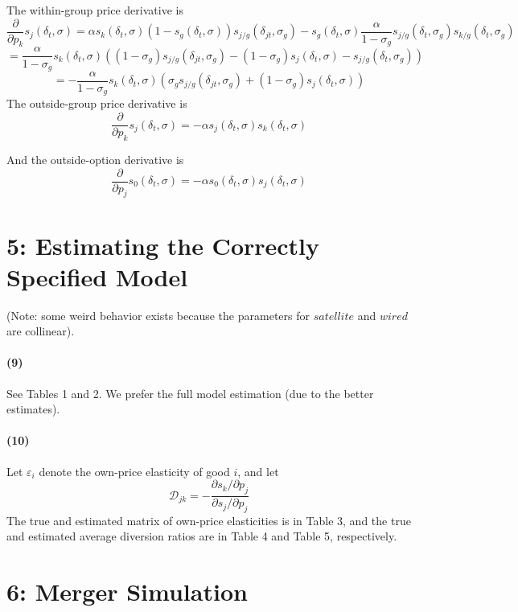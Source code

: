 \documentclass[10pt,letter]{article}
\begin{document}
The within-group price derivative is
\[ \frac{\partial }{\partial p_k}s_j(\delta_t, \sigma) = \alpha s_k(\delta_t, \sigma)(1-s_g(\delta_t, \sigma))s_{j/ g}(\delta_{jt}, \sigma_g)  - s_{g}(\delta_t, \sigma)\frac{\alpha}{1-\sigma_g} s_{j/ g}(\delta_{t}, \sigma_g)s_{k / g}(\delta_{t}, \sigma_g)\]
\[= \frac{\alpha}{1-\sigma_g} s_k(\delta_t, \sigma)\left( (1-\sigma_g)s_{j/ g}(\delta_{jt}, \sigma_g)-(1-\sigma_g)s_j(\delta_t, \sigma)  -  s_{j/ g}(\delta_{t}, \sigma_g)\right)\]
\[= - \frac{\alpha}{1-\sigma_g} s_k(\delta_t, \sigma)\left( \sigma_g s_{j/ g}(\delta_{jt}, \sigma_g)+ (1-\sigma_g)s_j(\delta_t, \sigma)  \right)\]
The outside-group price derivative is
\[\frac{\partial }{\partial p_k}s_j(\delta_t, \sigma) =- \alpha s_{j}(\delta_t, \sigma)s_{k}(\delta_t, \sigma) \]

And the outside-option derivative is
\[ \frac{\partial}{\partial p_j} s_0(\delta_t, \sigma) = - \alpha s_0(\delta_t, \sigma) s_j(\delta_t, \sigma)\]

\section*{5: Estimating the Correctly Specified Model}
(Note: some weird behavior exists because the parameters for $satellite$ and $wired$ are collinear).

\paragraph{(9)} See Tables 1 and 2. We prefer the full model estimation (due to the better estimates).

\paragraph{(10)} Let $\varepsilon_i$ denote the own-price elasticity of good $i$, and let\[ \mathcal{D}_{jk}  = - \frac{\partial s_{k} / \partial p_j}{\partial s_j / \partial p_j} \] The true and estimated matrix of own-price elasticities is in Table 3, and the true and estimated average diversion ratios are in Table 4 and Table 5, respectively.











\section*{6: Merger Simulation}
\end{document}
